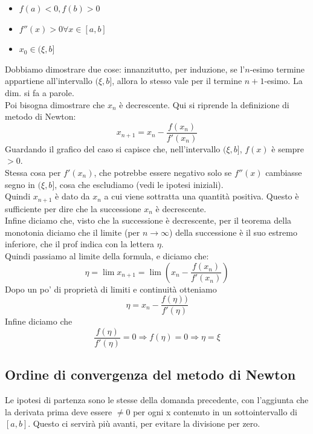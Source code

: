 \begin{itemize}
    \item $f(a)<0, f(b)>0$
    \item $f''(x)>0 \forall x \in [a,b]$
    \item $x_0 \in (\xi,b]$
\end{itemize}
Dobbiamo dimostrare due cose: innanzitutto, per induzione, se l'$n$-esimo termine appartiene all'intervallo $(\xi,b]$, allora lo stesso vale per il termine $n+1$-esimo. La dim. si fa a parole.\\
Poi bisogna dimostrare che ${x_n}$ è decrescente. Qui si riprende la definizione di metodo di Newton:
\begin{displaymath}
    x_{n+1} = x_n-\frac{f(x_n)}{f'(x_n)}
\end{displaymath}
Guardando il grafico del caso  si capisce che, nell'intervallo $(\xi,b]$, $f(x)$ è sempre $>0$.\\
Stessa cosa per $f'(x_n)$, che potrebbe essere negativo solo se $f''(x)$ cambiasse segno in $(\xi,b]$, cosa che escludiamo (vedi le ipotesi iniziali).\\
Quindi $x_{n+1}$ è dato da $x_n$ a cui viene sottratta una quantità positiva. Questo è sufficiente per dire che la successione ${x_n}$ è decrescente.\\
Infine diciamo che, visto che la successione è decrescente, per il teorema della monotonia diciamo che il limite (per $n\rightarrow \infty$) della successione è il suo estremo inferiore, che il prof indica con la lettera $\eta$.\\
Quindi passiamo al limite della formula, e diciamo che:
\begin{displaymath}
    \eta=\lim_{}x_{n+1}=\lim_{}\left ( x_n-\frac{f(x_n)}{f'(x_n)} \right )
\end{displaymath}
Dopo un po' di proprietà di limiti e continuità otteniamo
\begin{displaymath}
    \eta= x_n-\frac{f(\eta))}{f'(\eta)}
\end{displaymath}
Infine diciamo che
\begin{displaymath}
    \frac{f(\eta)}{f'(\eta)}=0 \Rightarrow f(\eta)=0\Rightarrow \eta = \xi
\end{displaymath}

\subsection{Ordine di convergenza del metodo di Newton}
Le ipotesi di partenza sono le stesse della domanda precedente, con l'aggiunta che la derivata prima deve essere $\neq 0$ per ogni x contenuto in un sottointervallo di $[a,b]$. Questo ci servirà più avanti, per evitare la divisione per zero.

